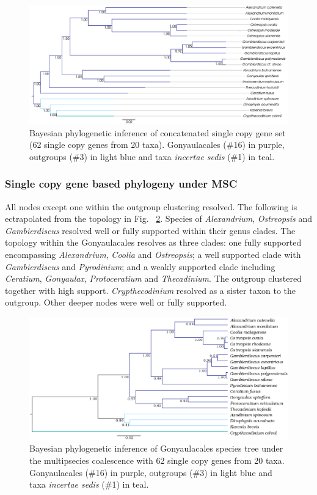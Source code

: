 \documentclass[12pt]{article}
\begin{document}
\begin{figure} 
\includegraphics[scale=.3]{figures/SC-concat-BI.png} 
\caption{Bayesian phylogenetic inference of concatenated single copy gene set (62 single copy genes from 20 taxa). Gonyaulacales (\#16) in purple, outgroups (\#3) in light blue and taxa \textit{incertae sedis} (\#1) in teal.} 
\label{fig:SCconcatBI}
\end{figure} 
\FloatBarrier

\subsubsection*{Single copy gene based phylogeny under MSC}
\FloatBarrier 
All nodes except one within the outgroup clustering resolved.
The following is ectrapolated from the topology in Fig. ~\ref{fig:SCmscBI}. 
Species of \emph{Alexandrium}, \emph{Ostreopsis} and \emph{Gambierdiscus} resolved well or fully supported within their genus clades. 
The topology within the Gonyaulacales resolves as three clades: 
one fully supported encompassing \emph{Alexandrium}, \emph{Coolia} and \emph{Ostreopsis}; 
a well supported clade with \emph{Gambierdiscus} and \emph{Pyrodinium}; 
and a weakly supported clade including \emph{Ceratium}, \emph{Gonyaulax}, \emph{Protoceratium} and \emph{Thecadinium}. 
The outgroup clustered together with high support. 
\emph{Crypthecodinium} resolved as a sister taxon to the outgroup. 
Other deeper nodes were well or fully supported.

\begin{figure} 
\includegraphics[scale=.25]{figures/Aug2_20-taxa-combined-fig_MCC_trees.png} 
\caption{Bayesian phylogenetic inference of Gonyaulacales species tree under the multipsecies coalescence with 62 single copy genes from 20 taxa. Gonyaulacales (\#16) in purple, outgroups (\#3) in light blue and taxa \textit{incertae sedis} (\#1) in teal.} 
\label{fig:SCmscBI}
\end{figure} 
\FloatBarrier
\end{document}
